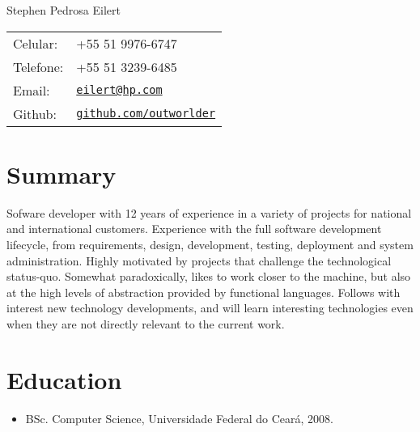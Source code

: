 \documentclass[letterpaper]{article}
\def\name{Stephen Pedrosa Eilert}
\begin{document}
\begin{flushright}

{\huge \name}


\vspace{0.25in}
\begin{minipage}{0.45\linewidth}
  \begin{tabular}{ll}
    Celular: & +55 51 9976-6747 \\
    Telefone: & +55 51 3239-6485 \\
    Email: & \href{mailto:eilert@hp.com}{\tt eilert@hp.com} \\
    Github: & \href{https://github.com/outworlder}{\tt github.com/outworlder}
  \end{tabular}
\end{minipage}
\end{flushright}

\section*{Summary}
  Sofware developer with 12 years of experience in a variety of projects for national and international customers. Experience with the full software development lifecycle, from requirements, design, development, testing, deployment and system administration. Highly motivated by projects that challenge the technological status-quo. Somewhat paradoxically, likes to work closer to the machine, but also at the high levels of abstraction provided by functional languages. Follows with interest new technology developments, and will learn interesting technologies even when they are not directly relevant to the current work.

\section*{Education}

\begin{itemize}
  \item BSc. Computer Science, Universidade Federal do Ceará, 2008.
\end{itemize}
\end{document}
